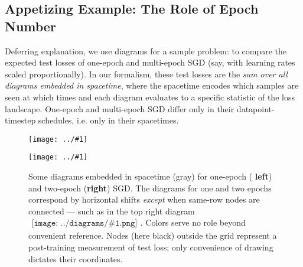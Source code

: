 \documentclass{article}
\newcommand{\plotmooh}[3]{
    \texttt{[image: ../\#1]}
}
\newcommand{\sdia}[1]{\begin{gathered}\texttt{[image: ../diagrams/\#1.png]}\end{gathered}}
\begin{document}
    \subsection{Appetizing Example: The Role of Epoch Number}
        Deferring explanation, we use diagrams for a sample problem: to compare
        the expected test losses of one-epoch and multi-epoch SGD (say, with
        learning rates scaled proportionally).  In our formalism, these test
        losses are the \emph{sum over all diagrams embedded in spacetime},
        where the spacetime encodes which samples are seen at which times and
        each diagram evaluates to a specific statistic of the loss landscape.
        One-epoch and multi-epoch SGD differ only in their datapoint-timestep
        schedules, i.e. only in their spacetimes. 

        \begin{figure}[h!] 
            \centering  
            \plotmooh{diagrams/spacetime-c}{0.32\columnwidth}{0.32\columnwidth}
            \plotmooh{diagrams/spacetime-d}{0.64\columnwidth}{0.32\columnwidth}
            \caption{
                Some diagrams embedded in spacetime (gray) for one-epoch ({\bf
                left}) and two-epoch ({\bf right}) SGD.  The diagrams for one
                and two epochs correspond by horizontal shifts \emph{except}
                when same-row nodes are connected --- such as in the top right
                diagram $\sdia{c(01-2)(01-12)}$.  Colors serve no role beyond
                convenient reference.  Nodes (here black) outside the grid
                represent a post-training measurement of test loss; only
                convenience of drawing dictates their coordinates.
            }
            \label{fig:epoch}
        \end{figure}
\end{document}
